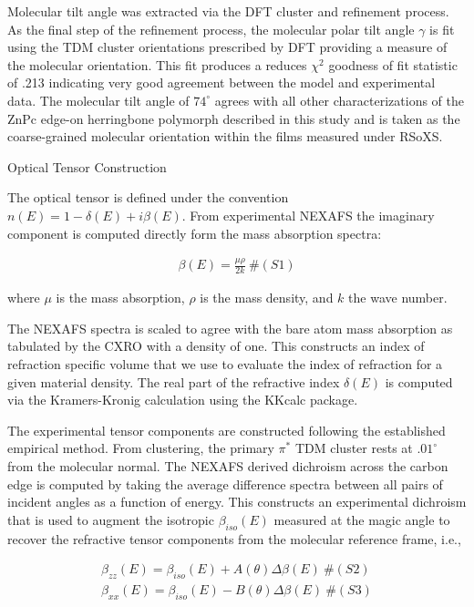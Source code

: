 Molecular tilt angle was extracted via the DFT cluster and refinement process. As the final step of the refinement process, the molecular polar tilt angle \(\gamma\) is fit using the TDM cluster orientations prescribed by DFT providing a measure of the molecular orientation. This fit produces a reduces \(\chi^{2}\) goodness of fit statistic of .213 indicating very good agreement between the model and experimental data. The molecular tilt angle of \(74^{\circ}\) agrees with all other characterizations of the ZnPc edge-on herringbone polymorph described in this study and is taken as the coarse-grained molecular orientation within the films measured under RSoXS.

Optical Tensor Construction

The optical tensor is defined under the convention \(n(E) = 1 - \delta(E) + i\beta(E)\). From experimental NEXAFS the imaginary component is computed directly form the mass absorption spectra:

\[\begin{array}{r}
\beta(E) = \frac{\mu\rho}{2k}\ \#(S1)
\end{array}\]

where \(\mu\) is the mass absorption, \(\rho\) is the mass density, and \(k\) the wave number.

The NEXAFS spectra is scaled to agree with the bare atom mass absorption as tabulated by the CXRO with a density of one.\autocite{matterndcxro} This constructs an index of refraction specific volume that we use to evaluate the index of refraction for a given material density. The real part of the refractive index \(\delta(E)\) is computed via the Kramers-Kronig calculation using the KKcalc package.\autocite{watts2014calculation}

The experimental tensor components are constructed following the established empirical method.\autocite{ferron2023composition,collins2012polarized} From clustering, the primary \(\pi^{*}\) TDM cluster rests at \({.01}^{\circ}\) from the molecular normal. The NEXAFS derived dichroism across the carbon edge is computed by taking the average difference spectra between all pairs of incident angles as a function of energy. This constructs an experimental dichroism that is used to augment the isotropic \(\beta_{iso}(E)\) measured at the magic angle to recover the refractive tensor components from the molecular reference frame, i.e.,

\[\begin{array}{r}
\beta_{zz}(E) = \beta_{iso}(E) + A(\theta)\Delta\beta(E)\ \#(S2) \\
\beta_{xx}(E) = \beta_{iso}(E) - B(\theta)\Delta\beta(E)\ \#(S3)
\end{array}\]


